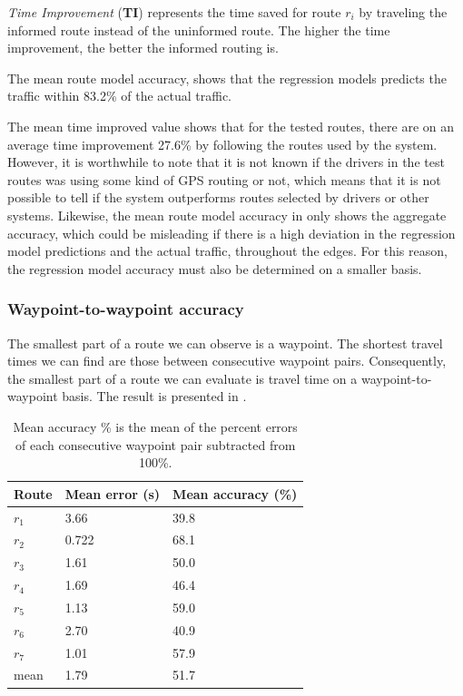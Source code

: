 \emph{Time Improvement} (\textbf{TI}) represents the time saved for route $r_i$ by traveling the informed route instead of the uninformed route. The higher the time improvement, the better the informed routing is.

The mean route model accuracy, shows that the regression models predicts the traffic within 83.2\% of the actual traffic. 

The mean time improved value shows that for the tested routes, there are on an average time improvement 27.6\% by following the routes used by the system. However, it is worthwhile to note that it is not known if the drivers in the test routes was using some kind of GPS routing or not, which means that it is not possible to tell if the system outperforms routes selected by drivers or other systems. Likewise, the mean route model accuracy in  only shows the aggregate accuracy, which could be misleading if there is a high deviation in the regression model predictions and the actual traffic, throughout the edges. For this reason, the regression model accuracy must also be determined on a smaller basis.

\subsubsection{Waypoint-to-waypoint accuracy}
The smallest part of a route we can observe is a waypoint. The shortest travel times we can find are those between consecutive waypoint pairs. Consequently, the smallest part of a route we can evaluate is travel time on a waypoint-to-waypoint basis. The result is presented in .

\begin{table}[H]
	\centering
	\begin{tabular}{lll}
		\textbf{Route} & \textbf{Mean error (s)}                          & \textbf{Mean accuracy (\%)} \\ \hline
		$r_1$          & 3.66                                             & 39.8 \\
		$r_2$          & 0.722                                            & 68.1 \\
		$r_3$          & 1.61                                             & 50.0 \\
		$r_4$          & 1.69                                             & 46.4 \\
		$r_5$          & 1.13                                             & 59.0 \\
		$r_6$          & 2.70                                             & 40.9 \\
		$r_7$          & 1.01                                             & 57.9 \\ \hline
		mean           & 1.79                                             & 51.7
	\end{tabular}
	\caption{Mean accuracy \% is the mean of the percent errors of each consecutive waypoint pair subtracted from 100\%.}
	\label{tab:eval-results-2}
\end{table}

